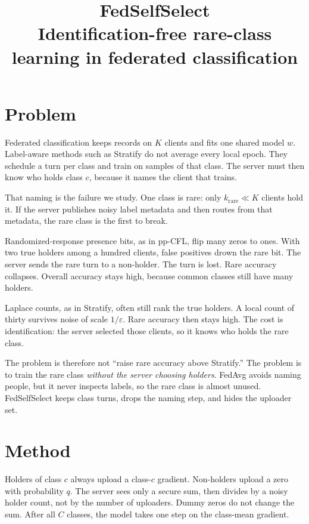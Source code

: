 \documentclass[11pt,a4paper]{article}
\title{\textbf{FedSelfSelect}\\[0.35em]
\large Identification-free rare-class learning in federated classification}
\author{}
\date{}
\theoremstyle{plain}
\begin{document}
\maketitle
\thispagestyle{plain}

\section{Problem}

Federated classification keeps records on $K$ clients and fits one shared model $w$. Label-aware methods such as Stratify do not average every local epoch. They schedule a turn per class and train on samples of that class. The server must then know who holds class $c$, because it names the client that trains.

That naming is the failure we study. One class is rare: only $k_{\mathrm{rare}}\ll K$ clients hold it. If the server publishes noisy label metadata and then routes from that metadata, the rare class is the first to break.

Randomized-response presence bits, as in pp-CFL, flip many zeros to ones. With two true holders among a hundred clients, false positives drown the rare bit. The server sends the rare turn to a non-holder. The turn is lost. Rare accuracy collapses. Overall accuracy stays high, because common classes still have many holders.

Laplace counts, as in Stratify, often still rank the true holders. A local count of thirty survives noise of scale $1/\varepsilon$. Rare accuracy then stays high. The cost is identification: the server selected those clients, so it knows who holds the rare class.

The problem is therefore not ``raise rare accuracy above Stratify.'' The problem is to train the rare class \emph{without the server choosing holders}. FedAvg avoids naming people, but it never inspects labels, so the rare class is almost unused. FedSelfSelect keeps class turns, drops the naming step, and hides the uploader set.

\section{Method}

Holders of class $c$ always upload a class-$c$ gradient. Non-holders upload a zero with probability $q$. The server sees only a secure sum, then divides by a noisy holder count, not by the number of uploaders. Dummy zeros do not change the sum. After all $C$ classes, the model takes one step on the class-mean gradient.
\end{document}
